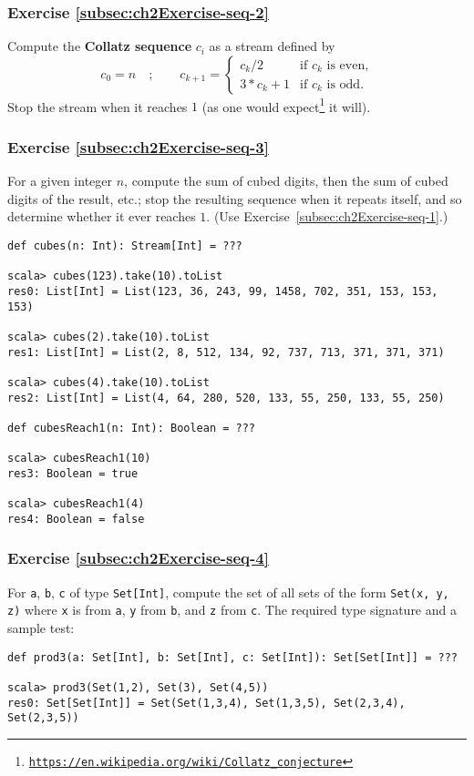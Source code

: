 \subsubsection{Exercise \label{subsec:ch2Exercise-seq-2}\ref{subsec:ch2Exercise-seq-2}}

Compute the \textbf{Collatz sequence} $c_{i}$
as a stream defined by
\[
c_{0}=n\quad;\quad\quad c_{k+1}=\begin{cases}
c_{k}/2 & \text{if }c_{k}\text{ is even,}\\
3*c_{k}+1 & \text{if }c_{k}\text{ is odd.}
\end{cases}
\]
Stop the stream when it reaches $1$ (as one would expect\footnote{\texttt{\href{https://en.wikipedia.org/wiki/Collatz_conjecture}{https://en.wikipedia.org/wiki/Collatz\_conjecture}}}
it will).

\subsubsection{Exercise \label{subsec:ch2Exercise-seq-3}\ref{subsec:ch2Exercise-seq-3}}

For a given integer $n$, compute the sum of cubed digits, then the
sum of cubed digits of the result, etc.; stop the resulting sequence
when it repeats itself, and so determine whether it ever reaches $1$.
(Use Exercise~\ref{subsec:ch2Exercise-seq-1}.)
\begin{lstlisting}
def cubes(n: Int): Stream[Int] = ???

scala> cubes(123).take(10).toList
res0: List[Int] = List(123, 36, 243, 99, 1458, 702, 351, 153, 153, 153)

scala> cubes(2).take(10).toList
res1: List[Int] = List(2, 8, 512, 134, 92, 737, 713, 371, 371, 371)

scala> cubes(4).take(10).toList
res2: List[Int] = List(4, 64, 280, 520, 133, 55, 250, 133, 55, 250)

def cubesReach1(n: Int): Boolean = ???

scala> cubesReach1(10)
res3: Boolean = true

scala> cubesReach1(4)
res4: Boolean = false
\end{lstlisting}


\subsubsection{Exercise \label{subsec:ch2Exercise-seq-4}\ref{subsec:ch2Exercise-seq-4}}

For \lstinline!a!, \lstinline!b!, \lstinline!c! of type \lstinline!Set[Int]!,
compute the set of all sets of the form \lstinline!Set(x, y, z)!
where \lstinline!x! is from \lstinline!a!, \lstinline!y! from \lstinline!b!,
and \lstinline!z! from \lstinline!c!. The required type signature
and a sample test:
\begin{lstlisting}
def prod3(a: Set[Int], b: Set[Int], c: Set[Int]): Set[Set[Int]] = ???

scala> prod3(Set(1,2), Set(3), Set(4,5))
res0: Set[Set[Int]] = Set(Set(1,3,4), Set(1,3,5), Set(2,3,4), Set(2,3,5))
\end{lstlisting}

